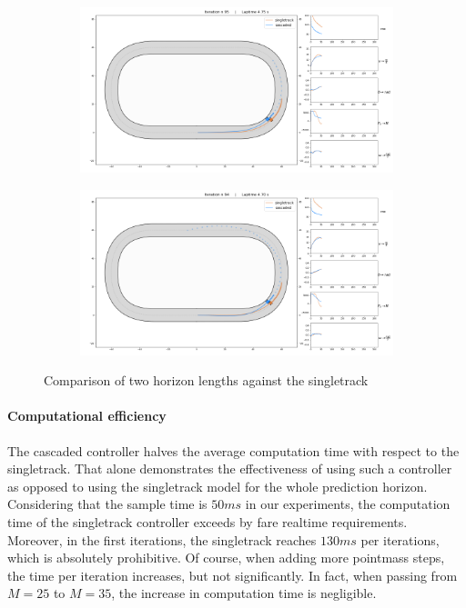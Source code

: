 \documentclass[a4paper, onecolumn, 12pt]{article}
\begin{document}
\begin{figure}[H] 
    \centering
        \begin{subfigure}{0.9\textwidth} 
        \centering
        \includegraphics[width=\textwidth]{assets/horizon_shorter.png}
    \end{subfigure}
    \begin{subfigure}{0.9\textwidth}
        \centering
        \includegraphics[width=\textwidth]{assets/horizon_longer.png}
    \end{subfigure}
    \caption[short]{Comparison of two horizon lengths against the singletrack}
    \label{horizons}
\end{figure}

\paragraph{Computational efficiency}
The cascaded controller halves the average computation time with respect to the
singletrack. That alone demonstrates the effectiveness of using such a
controller as opposed to using the singletrack model for the whole prediction
horizon. Considering that the sample time is $50ms$ in our experiments, the
computation time of the singletrack controller exceeds by fare realtime
requirements. Moreover, in the first iterations, the singletrack reaches $130ms$
per iterations, which is absolutely prohibitive. Of course, when adding more
pointmass steps, the time per iteration increases, but not significantly. In
fact, when passing from $M=25$ to $M=35$, the increase in computation time is
negligible.
\end{document}
